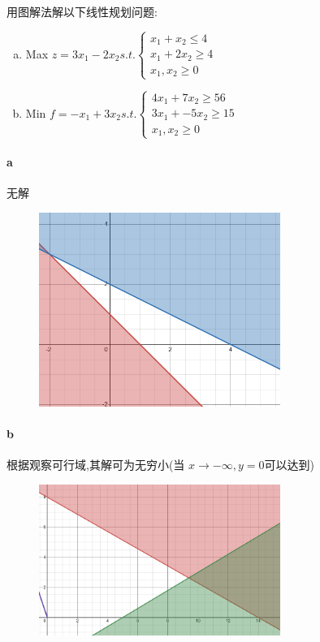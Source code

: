 \documentclass[a4paper]{article}
\begin{document}
用图解法解以下线性规划问题:
\begin{enumerate}[a)]
    \item Max $z = 3x_1 - 2x_2  s.t. \left\{ \begin{aligned}
        x_1 + x_2 \leq 4 \\
        x_1 + 2x_2 \geq 4\\
        x_1 , x_2 \geq 0
    \end{aligned}\right.$
    \item Min $f = -x_1 + 3x_2  s.t. \left\{ \begin{aligned}
        4x_1 + 7x_2 \geq 56 \\
        3x_1 + -5x_2 \geq 15\\
        x_1 , x_2 \geq 0
    \end{aligned}\right.$
\end{enumerate}

\paragraph{a} 无解
\begin{figure}[H]
    \centering
    \includegraphics[width=0.7\textwidth]{pic/5-a.png}
\end{figure}

\paragraph{b}

根据观察可行域,其解可为无穷小(当 $ x\rightarrow -\infty, y=0$可以达到)


\begin{figure}[H]
    \centering
    \includegraphics[width=0.7\textwidth]{pic/5-b.png}
\end{figure}
\end{document}

